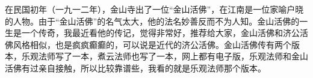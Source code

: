 \begin{book}
    在民国初年（一九一二年），金山寺出了一位“金山活佛”，在江南是一位家喻户晓的人物。由于“金山活佛”的名气太大，他的法名妙善反而不为人知。金山活佛的一生是一个传奇，我最近看他的传记，觉得非常好，推荐给大家，金山活佛和济公活佛风格相似，也是疯疯癫癫的，可以说是近代的济公活佛。金山活佛传有两个版本，乐观法师写了一本，煮云法师也写了一本，网上都有电子版，乐观法师和金山活佛有过亲自接触，所以比较靠谱些，我看的就是乐观法师那个版本。
\end{book}
